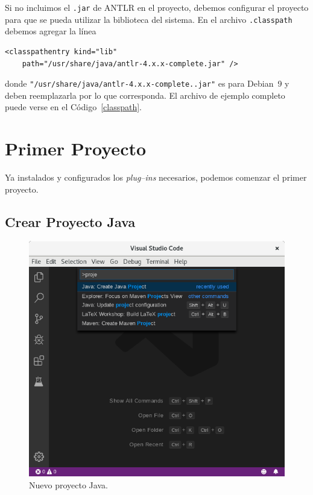 \documentclass[a5paper,10pt]{article}
\begin{document}


Si no incluimos el \verb|.jar| de ANTLR en el proyecto, debemos configurar el proyecto para que se pueda utilizar la biblioteca del sistema.  En el archivo \verb|.classpath| debemos agregar la línea
\begin{lstlisting}[style=miXML]
<classpathentry kind="lib"
    path="/usr/share/java/antlr-4.x.x-complete.jar" />	
\end{lstlisting}
donde \verb|"/usr/share/java/antlr-4.x.x-complete..jar"| es para Debian~9 y deben reemplazarla por lo que corresponda.  El archivo de ejemplo completo puede verse en el Código~\ref{classpath}.




\section{Primer Proyecto}
\label{primerproyecto}

Ya instalados y configurados los \emph{plug--ins} necesarios, podemos comenzar el primer proyecto.

\subsection{Crear Proyecto Java}
\label{proyecto_java}

\begin{figure}[t]
	\centering
	\includegraphics[width=.95\textwidth]{img/NuevoProyecto}
	\caption{Nuevo proyecto Java.}
	\label{maven_nuevo}
\end{figure}
\end{document}
